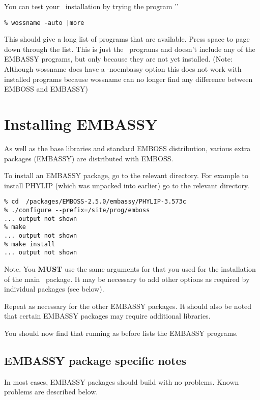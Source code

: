 \documentclass{report}
\begin{document}
You can test your \EMBOSS\ installation by trying the program
''

\begin{verbatim}
% wossname -auto |more
\end{verbatim}

This should give a long list of programs that are available. Press
space to page down through the list. This is just the \EMBOSS\
programs and doesn't include any of the EMBASSY programs, but only
because they are not yet installed. (Note: Although wossname does have
a -noembassy option this does not work with installed programs because
wossname can no longer find any difference between EMBOSS and EMBASSY)

\section{Installing EMBASSY}

As well as the base libraries and standard EMBOSS distribution,
various extra packages (EMBASSY) are distributed with EMBOSS.

To install an EMBASSY package, go to the relevant directory. For
example to install PHYLIP (which was unpacked into
 earlier) go to
the relevant directory.

\begin{verbatim}
% cd  /packages/EMBOSS-2.5.0/embassy/PHYLIP-3.573c
% ./configure --prefix=/site/prog/emboss
... output not shown
% make
... output not shown
% make install
... output not shown
\end{verbatim}

Note. You {\bf MUST} use the same arguments for 
that you used for the installation of the main \EMBOSS\ package. It
may be necessary to add other options as required by individual
packages (see below).

Repeat as necessary for the other EMBASSY packages. It should also be
noted that certain EMBASSY packages may require additional libraries.
 
You should now find that running  as before lists
the EMBASSY programs.

\subsection{EMBASSY package specific notes}

In most cases, EMBASSY packages should build with no problems. Known
problems are described below.
\end{document}
